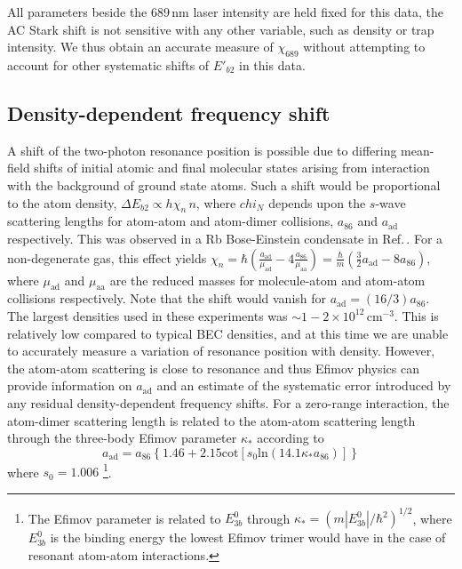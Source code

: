 All parameters beside the $689$\,nm laser intensity are held fixed for this data, the AC Stark shift is not sensitive  with any other variable, such as density or trap intensity.
We thus obtain an accurate measure of $\chi_{689}$ without attempting to account for other systematic shifts of $E'_{b2}$ in this data.

\subsection{Density-dependent frequency shift}
A shift of the two-photon resonance position is possible due to differing mean-field shifts of initial atomic and final molecular states arising from interaction with the background of ground state atoms.
Such a shift would be proportional to the atom density, $\Delta E_{b2} \propto h \chi_n\,n$, where $chi_N$ depends upon the $s$-wave scattering lengths for atom-atom and atom-dimer collisions, $a_{86}$ and $a_{\text{ad}}$ respectively.
This was observed in a Rb Bose-Einstein condensate in Ref.\,\cite{Wynar2000}. 
For a non-degenerate gas, this effect yields $\chi_n=\hbar (\frac{a_{\text{ad}}}{\mu_{\text{ad}}}-4\frac{a_{86}}{\mu_{\text{aa}}})=\frac{\hbar}{m} (\frac{3 }{2}a_{\text{ad}}-8 a_{86})$, where $\mu_{\text{ad}}$ and $\mu_{\text{aa}}$ are the reduced masses for molecule-atom and atom-atom collisions respectively.
Note that the shift would vanish for $a_{\text{ad}}=(16/3) a_{86}$.
The largest densities used in these experiments was $\sim 1-2\times 10^{12}\,\mathrm{cm}^{-3}$.
This is relatively low compared to typical BEC densities, and at this time we are unable to accurately measure a variation of resonance position with density.
However, the atom-atom scattering is close to resonance and thus Efimov physics can provide information on $a_{\text{ad}}$ \cite{bha07,nen17} and an estimate of the systematic error introduced by any residual density-dependent frequency shifts.
For a zero-range interaction, the atom-dimer scattering length is related to the atom-atom scattering length through the three-body Efimov parameter $\kappa_*$ according to \cite{bha07}
\begin{equation}\label{Eq:EfimovMoleculAtomScatteringLength}
  a_{\text{ad}}=a_{86}\left\{1.46 + 2.15 \mathrm{cot}[s_0 \mathrm{ln} (14.1\kappa_* a_{86}) ]\right\}
\end{equation}
where $s_0=1.006$ \footnote{The Efimov parameter is related to $E^0_{3b}$ through $\kappa_*=(m|E^0_{3b}|/\hbar^2)^{1/2}$, where $E^0_{3b}$ is the binding energy the lowest Efimov trimer would have in the case of resonant atom-atom interactions.}.

